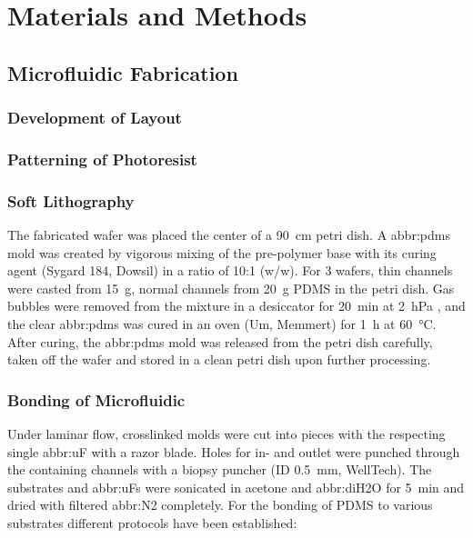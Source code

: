 \chapter{Materials and Methods}

\section{Microfluidic Fabrication}

\subsection{Development of Layout}

\subsection{Patterning of Photoresist}

\subsection{Soft Lithography}
The fabricated wafer was placed the center of a \SI{90}{\centi\meter} petri dish. A \gls{abbr:pdms} mold was created by vigorous mixing of the pre-polymer base with its curing agent (Sygard 184, Dowsil) in a ratio of 10:1 (w/w). For \SI{3}{\inch} wafers, thin channels were casted from \SI{15}{\gram}, normal channels from \SI{20}{\gram} PDMS in the petri dish. Gas bubbles were removed from the mixture in a desiccator for \SI{20}{\minute} at \SI{2}{\hecto\pascal} , and the clear \gls{abbr:pdms} was cured in an oven (Um, Memmert) for \SI{1}{\hour} at \SI{60}{\degreeCelsius}. After curing, the \gls{abbr:pdms} mold was released from the petri dish carefully, taken off the wafer and stored in a clean petri dish upon further processing.

\subsection{Bonding of Microfluidic}
Under laminar flow, crosslinked molds were cut into pieces with the respecting single \gls{abbr:uF} with a razor blade. Holes for in- and outlet were punched through the containing channels with a biopsy puncher (ID \SI{0.5}{\milli\meter}, WellTech). The substrates and \glspl{abbr:uF} were sonicated in acetone and \gls{abbr:diH2O} for \SI{5}{\minute} and dried with filtered \gls{abbr:N2} completely. For the bonding of PDMS to various substrates different protocols have been established:

